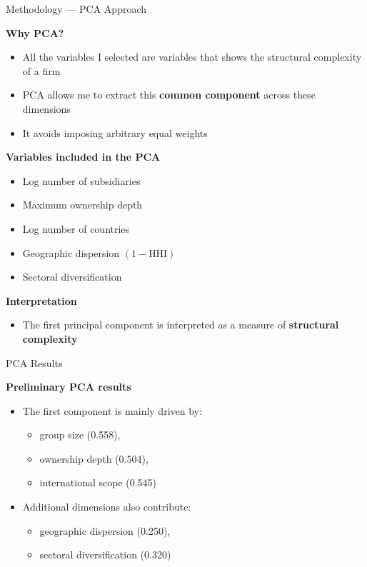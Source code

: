 \documentclass[11pt,aspectratio=169]{beamer}
\begin{document}
  \begin{frame}{Methodology --- PCA Approach}
  
  \textbf{Why PCA?}
  
  \begin{itemize}
      \item All the variables I selected are variables that shows the structural complexity of a firm
      \item PCA allows me to extract this \textbf{common component} across these dimensions
      \item It avoids imposing arbitrary equal weights
  \end{itemize}
  
  
  \textbf{Variables included in the PCA}
  
  \begin{itemize}
      \item Log number of subsidiaries
      \item Maximum ownership depth
      \item Log number of countries
      \item Geographic dispersion $(1-\text{HHI})$
      \item Sectoral diversification
  \end{itemize}
  
  \textbf{Interpretation}
  
  \begin{itemize}
      \item The first principal component is interpreted as a measure of \textbf{structural complexity}
  \end{itemize}
  
  \end{frame}
  
  \begin{frame}{PCA Results}
  
  \textbf{Preliminary PCA results}
  
  \begin{itemize}
      \item The first component is mainly driven by:
      \begin{itemize}
          \item group size (0.558),
          \item ownership depth (0.504),
          \item international scope (0.545)
      \end{itemize}
     
      \item Additional dimensions also contribute:
      \begin{itemize}
          \item geographic dispersion (0.250),
          \item sectoral diversification (0.320)
      \end{itemize}
  \end{itemize}
  
  \end{frame}
  
\end{document}
